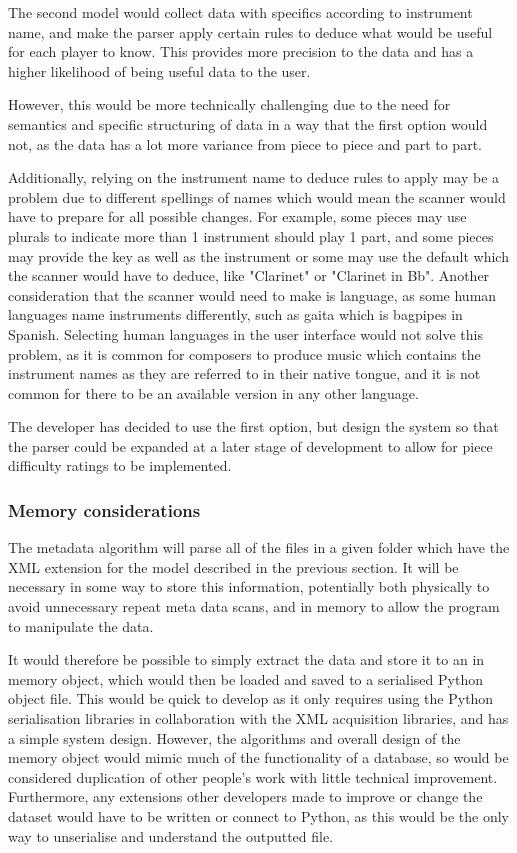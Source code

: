 The second model would collect data with specifics according to instrument name, and make the parser apply certain rules to deduce what would be useful for each player to know. This provides more precision to the data and has a higher likelihood of being useful data to the user. 

However, this would be more technically challenging due to the need for semantics and specific structuring of data in a way that the first option would not, as the data has a lot more variance from piece to piece and part to part. 

Additionally, relying on the instrument name to deduce rules to apply may be a problem due to different spellings of names which would mean the scanner would have to prepare for all possible changes. For example, some pieces may use plurals to indicate more than 1 instrument should play 1 part, and some pieces may provide the key as well as the instrument or some may use the default which the scanner would have to deduce, like "Clarinet" or "Clarinet in Bb". Another consideration that the scanner would need to make is language, as some human languages name instruments differently, such as gaita which is bagpipes in Spanish. Selecting human languages in the user interface would not solve this problem, as it is common for composers to produce music which contains the instrument names as they are referred to in their native tongue, and it is not common for there to be an available version in any other language.

The developer has decided to use the first option, but design the system so that the parser could be expanded at a later stage of development to allow for piece difficulty ratings to be implemented.

\subsubsection{Memory considerations}
The metadata algorithm will parse all of the files in a given folder which have the XML extension for the model described in the previous section. It will be necessary in some way to store this information, potentially both physically to avoid unnecessary repeat meta data scans, and in memory to allow the program to manipulate the data.

It would therefore be possible to simply extract the data and store it to an in memory object, which would then be loaded and saved to a serialised Python object file. This would be quick to develop as it only requires using the Python serialisation libraries in collaboration with the XML acquisition libraries, and has a simple system design. 
However, the algorithms and overall design of the memory object would mimic much of the functionality of a database, so would be considered duplication of other people's work with little technical improvement. 
Furthermore, any extensions other developers made to improve or change the dataset would have to be written or connect to Python, as this would be the only way to unserialise and understand the outputted file.

